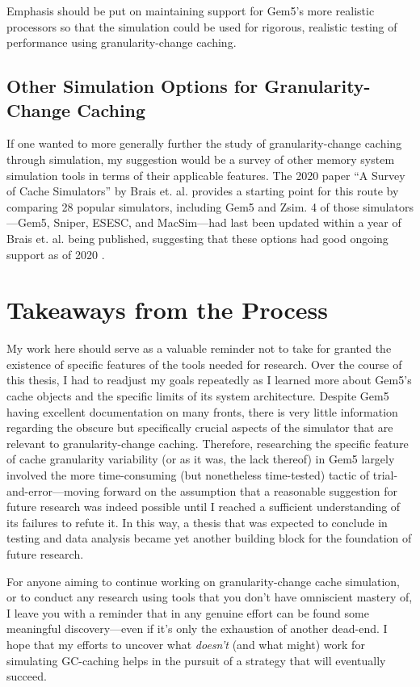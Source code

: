 \documentclass[12pt,twoside]{reedthesis}
\begin{document}
	Emphasis should be put on maintaining support for Gem5's more realistic processors so that the simulation could be used for rigorous, realistic testing of performance using granularity-change caching.

	\subsection*{Other Simulation Options for Granularity-Change Caching}

	If one wanted to more generally further the study of granularity-change caching through simulation, my suggestion would be a survey of other memory system simulation tools in terms of their applicable features. The 2020 paper ``A Survey of Cache Simulators'' by Brais et. al. provides a starting point for this route by comparing 28 popular simulators, including Gem5 and Zsim. 4 of those simulators---Gem5, Sniper, ESESC, and MacSim---had last been updated within a year of Brais et. al. being published, suggesting that these options had good ongoing support as of 2020 \cite{brais}.

\section{Takeaways from the Process}

	My work here should serve as a valuable reminder not to take for granted the existence of specific features of the tools needed for research. Over the course of this thesis, I had to readjust my goals repeatedly as I learned more about Gem5's cache objects and the specific limits of its system architecture. Despite Gem5 having excellent documentation on many fronts, there is very little information regarding the obscure but specifically crucial aspects of the simulator that are relevant to granularity-change caching. Therefore, researching the specific feature of cache granularity variability (or as it was, the lack thereof) in Gem5 largely involved the more time-consuming (but nonetheless time-tested) tactic of trial-and-error---moving forward on the assumption that a reasonable suggestion for future research was indeed possible until I reached a sufficient understanding of its failures to refute it. In this way, a thesis that was expected to conclude in testing and data analysis became yet another building block for the foundation of future research.

	For anyone aiming to continue working on granularity-change cache simulation, or to conduct any research using tools that you don't have omniscient mastery of, I leave you with a reminder that in any genuine effort can be found some meaningful discovery---even if it's only the exhaustion of another dead-end. I hope that my efforts to uncover what \textit{doesn't} (and what might) work for simulating GC-caching helps in the pursuit of a strategy that will eventually succeed.
	
\end{document}
